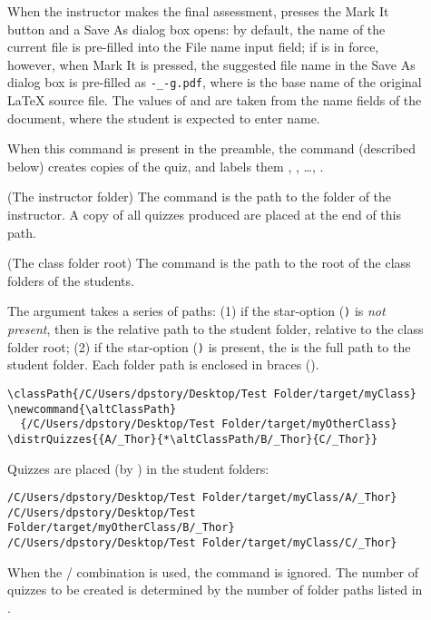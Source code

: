 \documentclass{article}
\makeatletter
\def\heshe{\@ifstar{\heshei}{\global\advance\hesheCnt1\relax\heshei}}
\def\heshei{\ifodd\hesheCnt she\else he\fi}
\def\hisher{\@ifstar{\hisheri}{\global\advance\hesheCnt1\relax\hisheri}}
\def\hisheri{\ifodd\hesheCnt her\else his\fi}
\makeatother
\begin{document}
\begin{description}
    \item[] When the instructor makes the final
        assessment, {\heshe} presses the \textsf{Mark It} button and a
        \textsf{Save As} dialog box opens: by default, the name of the
        current file is pre-filled into the \textsf{File name} input field;
        if  is in force, however, when \textsf{Mark
        It} is pressed, the suggested file name in the \textsf{Save As}
        dialog box is pre-filled as
        \texttt{-\_-g.pdf}, where
         is the base name of the original {\LaTeX} source file.
        The values of  and  are taken from the
        name fields of the document, where the student is expected to enter
        {\hisher} name.
    \item[] When this command is present
        in the preamble, the command  (described below)
        creates  copies of the quiz, and labels them
        , , \dots,
        .
    \item [] (The instructor folder) The
         command is the path to the folder of the instructor.
        A copy of all quizzes produced are placed at the end of this path.
    \item [] (The class folder root) The
         command is the path to the root of the class folders
        of the students.
    \item[]
        The argument takes a series of paths: (1) if the star-option
        (\texttt*) is \emph{not present}, then  is the relative
        path to the student folder, relative to the class folder root; (2)
        if the star-option (\texttt*) is present, the  is the
        full path to the student folder. Each folder path is enclosed in
        braces (\darg{}).
\begin{Verbatim}[fontsize=\small]
\classPath{/C/Users/dpstory/Desktop/Test Folder/target/myClass}
\newcommand{\altClassPath}
  {/C/Users/dpstory/Desktop/Test Folder/target/myOtherClass}
\distrQuizzes{{A/_Thor}{*\altClassPath/B/_Thor}{C/_Thor}}
\end{Verbatim}
Quizzes are placed (by ) in the student folders:
\begin{Verbatim}[fontsize=\small]
/C/Users/dpstory/Desktop/Test Folder/target/myClass/A/_Thor}
/C/Users/dpstory/Desktop/Test Folder/target/myOtherClass/B/_Thor}
/C/Users/dpstory/Desktop/Test Folder/target/myClass/C/_Thor}
\end{Verbatim}
When the / combination is used, the
 command is ignored. The number of quizzes to be created is
determined by the number of folder paths listed in .
\end{description}
\end{document}
